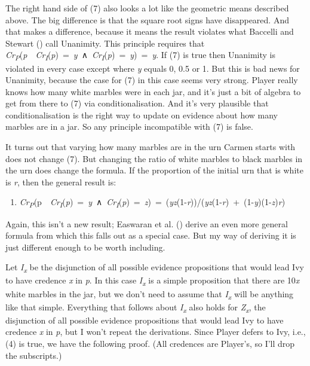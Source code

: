 \documentclass[
  10pt,
  letterpaper,
  DIV=11,
  numbers=noendperiod,
  twoside]{scrartcl}
\providecommand{\tightlist}{%
  \setlength{\itemsep}{0pt}\setlength{\parskip}{0pt}}\usepackage{longtable,booktabs,array}
\begin{document}
The right hand side of (7) also looks a lot like the geometric means
described above. The big difference is that the square root signs have
disappeared. And that makes a difference, because it means the result
violates what Baccelli and Stewart
() call Unanimity. This
principle requires that
\emph{Cr\textsubscript{P}}(\emph{p}~\textbar~\emph{Cr\textsubscript{I}}(\emph{p})~=~\emph{y}~∧~\emph{Cr\textsubscript{I}}(\emph{p})~=~\emph{y})~=~\emph{y}.
If (7) is true then Unanimity is violated in every case except where
\emph{y} equals 0, 0.5 or 1. But this is bad news for Unanimity, because
the case for (7) in this case seems very strong. Player really knows how
many white marbles were in each jar, and it's just a bit of algebra to
get from there to (7) via conditionalisation. And it's very plausible
that conditionalisation is the right way to update on evidence about how
many marbles are in a jar. So any principle incompatible with (7) is
false.

It turns out that varying how many marbles are in the urn Carmen starts
with does not change (7). But changing the ratio of white marbles to
black marbles in the urn does change the formula. If the proportion of
the initial urn that is white is \emph{r}, then the general result is:

\begin{enumerate}
\def\labelenumi{(\arabic{enumi})}
\setcounter{enumi}{7}
\tightlist
\item
  \emph{Cr\textsubscript{P}}(p~\textbar~\emph{Cr\textsubscript{I}}(\emph{p})~=~\emph{y}~∧~\emph{Cr\textsubscript{I}}(\emph{p})~=~\emph{z})~=~(\emph{yz}(1-\emph{r}))/(\emph{yz}(1-\emph{r})~+~(1-\emph{y})(1-\emph{z})\emph{r})
\end{enumerate}

Again, this isn't a new result; Easwaran et al.
() derive an even more general
formula from which this falls out as a special case. But my way of
deriving it is just different enough to be worth including.

Let \emph{I\textsubscript{x}} be the disjunction of all possible
evidence propositions that would lead Ivy to have credence \emph{x} in
\emph{p}. In this case \emph{I\textsubscript{x}} is a simple proposition
that there are 10\emph{x} white marbles in the jar, but we don't need to
assume that \emph{I\textsubscript{x}} will be anything like that simple.
Everything that follows about \emph{I\textsubscript{x}} also holds for
\emph{Z\textsubscript{x}}, the disjunction of all possible evidence
propositions that would lead Ivy to have credence \emph{x} in \emph{p},
but I won't repeat the derivations. Since Player defers to Ivy, i.e.,
(4) is true, we have the following proof. (All credences are Player's,
so I'll drop the subscripts.)
\end{document}
